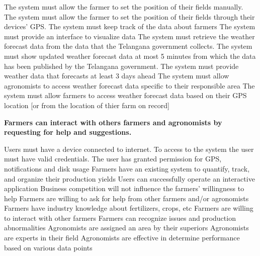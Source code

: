 \begin{itemize}
\begin{itemize}
 The system must allow the farmer to set the position of their fields manually.
 The system must allow the farmer to set the position of their fields through their devices' GPS.
 The system must keep track of the data about farmers
 The system must provide an interface to visualize data
 The system must retrieve the weather forecast data from the data that the Telangana government collects.
 The system must show updated weather forecast data at most 5 minutes from which the data has been published by the Telangana government.
 The system must provide weather data that forecasts at least 3 days ahead
 The system must allow agronomists to access weather forecast data specific to their responsible area
 The system must allow farmers to access weather forecast data based on their GPS location [or from the location of thier farm on record]

\end{itemize}

 \textbf{Farmers can interact with others farmers and agronomists by requesting for help and suggestions.}

\begin{itemize}
  Users must have a device connected to internet.
 To access to the system the user must have valid credentials.
 The user has granted permission for GPS, notifications and disk usage
 Farmers have an existing system to quantify, track, and organize their production yields
 Users can successfully operate an interactive application
 Business competition will not influence the farmers' willingness to help
 Farmers are willing to ask for help from other farmers and/or agronomists
 Farmers have industry knowledge about fertilizers, crops, etc 
 Farmers are willing to interact with other farmers 
 Farmers can recognize issues and production abnormalities
 Agronomists are assigned an area by their superiors
 Agronomists are experts in their field
 Agronomists are effective in determine performance based on various data points


\end{itemize}
\end{itemize}
